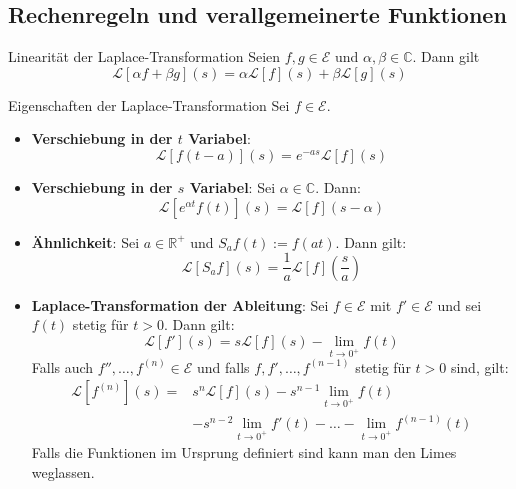 \documentclass[a4paper,10pt]{article}
\begin{document}
\subsection{Rechenregeln und verallgemeinerte Funktionen}

\begin{subbox}{Linearität der Laplace-Transformation}
  Seien \(f,g\in\mathcal{E}\) und \(\alpha,\beta\in\mathbb{C}\). Dann gilt \begin{equation*} \mathcal{L}[\alpha f+\beta g](s)=\alpha\mathcal{L}[f](s)+\beta\mathcal{L}[g](s) \end{equation*}
\end{subbox}

\begin{mainbox}{Eigenschaften der Laplace-Transformation}
  Sei \(f\in\mathcal{E}\).
  \begin{itemize}
    \item{
      \textbf{Verschiebung in der \(t\) Variabel}:
      \begin{equation*} \mathcal{L}[f(t-a)](s)=e^{-as}\mathcal{L}[f](s) \end{equation*}
    }
    \item{
      \textbf{Verschiebung in der \(s\) Variabel}: Sei \(\alpha\in\mathbb{C}\). Dann: \begin{equation*} \mathcal{L}[e^{\alpha t}f(t)](s)=\mathcal{L}[f](s-\alpha) \end{equation*}
    }
    \item{
      \textbf{Ähnlichkeit}: Sei \(a\in\mathbb{R}^+\) und \(S_af(t):=f(at)\). Dann gilt: \begin{equation*} \mathcal{L}[S_af](s)=\frac{1}{a}\mathcal{L}[f]\left(\frac{s}{a}\right) \end{equation*}
    }
    \item{
      \textbf{Laplace-Transformation der Ableitung}: Sei \(f\in\mathcal{E}\) mit \(f'\in\mathcal{E}\) und sei \(f(t)\) stetig für \(t>0\). Dann gilt:
       \begin{equation*} \mathcal{L}[f'](s)=s\mathcal{L}[f](s)-\lim_{t\to0^+}f(t) \end{equation*} Falls auch \(f'',\dots,f^{( n )}\in\mathcal{E}\) und falls \(f,f',\dots,f^{(n-1)}\) stetig für \(t>0\) sind, gilt:
        \begin{align*} 
          \mathcal{L}[f^{( n )}](s) = & s^n\mathcal{L}[f](s) - s^{n-1}\lim_{t\to0^+}f(t) \\
          & - s^{n-2}\lim_{t\to0^+}f'(t) -\dots -\lim_{t\to0^+}f^{(n-1)}(t) 
        \end{align*}
        Falls die Funktionen im Ursprung definiert sind kann man den Limes weglassen.
    }
  \end{itemize}
\end{mainbox}
\end{document}
